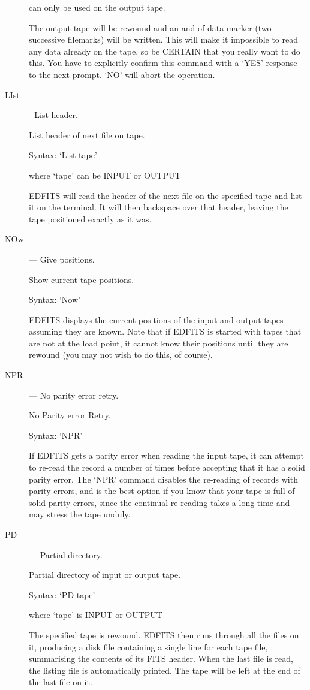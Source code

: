 \begin{description}
can only be used on the output tape.

The output tape will be rewound and an and of data marker (two
successive filemarks) will be written. This will make it impossible
to read any data already on the tape, so be CERTAIN that you really
want to do this. You have to explicitly confirm this command with a
`YES' response to the next prompt.  `NO' will abort the operation.

\item [LIst] - List header.

List header of next file on tape.

Syntax:   `List  tape'

where `tape' can be INPUT or OUTPUT

EDFITS will read the header of the next file on the specified tape
and list it on the terminal. It will then backspace over that header,
leaving the tape positioned exactly as it was.

\item [NOw] --- Give positions.

Show current tape positions.

Syntax:   `Now'

EDFITS displays the current positions of the input and output
tapes - assuming they are known.  Note that if EDFITS is started
with tapes that are not at the load point, it cannot know their
positions until they are rewound (you may not wish to do this, of
course).

\item [NPR] --- No parity error retry.

No Parity error Retry.

Syntax:   `NPR'

If EDFITS gets a parity error when reading the input tape, it can
attempt to re-read the record a number of times before accepting
that it has a solid parity error.  The `NPR' command disables the
re-reading of records with parity errors, and is the best option if
you know that your tape is full of solid parity errors, since the
continual re-reading takes a long time and may stress the tape
unduly.

\item [PD] --- Partial directory.

Partial directory of input or output tape.

Syntax:  `PD  tape'

where `tape' is INPUT or OUTPUT

The specified tape is rewound.  EDFITS then runs through all the
files on it, producing a disk file containing a single line for
each tape file, summarising the contents of its FITS header. When
the last file is read, the listing file is automatically printed.
The tape will be left at the end of the last file on it.


\end{description}
